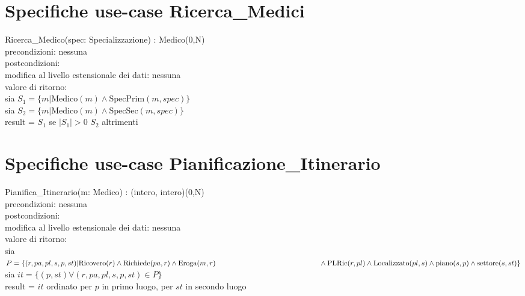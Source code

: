 \documentclass[a4paper,12pt]{report}
\begin{document}
      \section{Specifiche use-case Ricerca\_Medici}
        \hspace*{1cm}Ricerca\_Medico(spec: Specializzazione) : Medico(0,N) \\
        \hspace*{2cm}precondizioni: nessuna \\
        \hspace*{2cm}postcondizioni: \\
        \hspace*{3cm}modifica al livello estensionale dei dati: nessuna \\
        \hspace*{3cm}valore di ritorno: \\
        \hspace*{4cm}sia $S_1 = \{m | \text{Medico}(m) \wedge \text{SpecPrim}(m, spec)\}$ \\
        \hspace*{4cm}sia $S_2 = \{m | \text{Medico}(m) \wedge \text{SpecSec}(m, spec)\}$ \\
        \hspace*{4cm}result = $S_1$ se $|S_1| > 0$ $S_2$ altrimenti \\

      \newpage

      \section{Specifiche use-case Pianificazione\_Itinerario}
        \hspace*{1cm}Pianifica\_Itinerario(m: Medico) : (intero, intero)(0,N) \\
        \hspace*{2cm}precondizioni: nessuna \\
        \hspace*{2cm}postcondizioni: \\
        \hspace*{3cm}modifica al livello estensionale dei dati: nessuna \\
        \hspace*{3cm}valore di ritorno: \\
        \hspace*{4cm}sia $P = \{(r, pa, pl, s, p, st) | \text{Ricovero}(r) \wedge \text{Richiede}(pa, r) \wedge \text{Eroga}(m, r) \\
        \hspace*{5cm}\wedge \text{PLRic}(r, pl) \wedge \text{Localizzato}(pl, s) \wedge \text{piano}(s, p) \wedge \text{settore}(s, st)\}$ \\
        \hspace*{4cm}sia $it = \{(p, st) \forall (r, pa, pl, s, p, st) \in P\}$ \\
        \hspace*{4cm}result = $it$ ordinato per $p$ in primo luogo, per $st$ in secondo luogo \\
\end{document}
